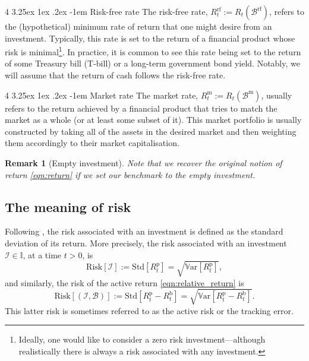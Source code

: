 \documentclass[12pt]{article}
\makeatletter
\newtheorem{remark}{Remark}[section]
\renewcommand\paragraph{%
	\@startsection{paragraph}
	{4}
	{\z@}
	{3.25ex \@plus1ex \@minus.2ex}
	{-1em}
	{\normalfont\normalsize\bfseries\maybe@addperiod}%
}
\newcommand{\maybe@addperiod}[1]{%
	#1\@addpunct{.}%
}
\makeatother
\begin{document}
\paragraph{Risk-free rate} The risk-free rate, $R_t^{\text{rf}} := R_t(\mathcal{B}^{\text{rf}})$, refers to the (hypothetical) minimum rate of return that one might desire from an investment. Typically, this rate is set to the return of a financial product whose risk is minimal\footnote{Ideally, one would like to consider a zero risk investment---although realistically there is always a risk associated with any investment.}. In practice, it is common to see this rate being set to the return of some Treasury bill (T-bill) or a long-term government bond yield. Notably, we will assume that the return of cash follows the risk-free rate.

\paragraph{Market rate} The market rate, $R_t^{\text{m}} := R_t(\mathcal{B}^{\text{m}})$, usually refers to the return achieved by a financial product that tries to match the market as a whole (or at least some subset of it). This market portfolio is usually constructed by taking all of the assets in the desired market and then weighting them accordingly to their market capitalisation.

\begin{remark}
	[Empty investment] Note that we recover the original notion of return \eqref{eqn:return} if we set our benchmark to the empty investment.
\end{remark}
\subsection{The meaning of risk}
Following \cite{grinold1999}, the risk associated with an investment is defined as the standard deviation of its return. More precisely, the risk associated with an investment $\mathcal{I} \in \mathbb{I}$, at a time $t > 0$, is
\begin{equation}
	\text{Risk}[\mathcal{I}] := \text{Std}[R_t^{\text{p}}] = \sqrt{\mathbb{V}\text{ar}[R_t^{\text{p}}]},
\end{equation}
and similarly, the risk of the active return \eqref{eqn:relative_return} is 
\begin{equation}
	\text{Risk}[(\mathcal{I}, \mathcal{B})] := \text{Std}[R_t^{\text{p}} - R_t^{\text{b}}] = \sqrt{\mathbb{V}\text{ar}[R_t^{\text{p}} - R_t^{\text{b}}]}.
\end{equation}
This latter risk is sometimes referred to as the active risk or the tracking error.
\end{document}

